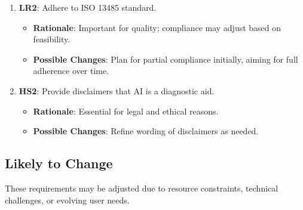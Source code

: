 \documentclass[12pt]{article}
\begin{document}
\begin{enumerate}[resume]
    \item \textbf{LR2}: Adhere to ISO 13485 standard.
    \begin{itemize}[label=-]
        \item \textbf{Rationale}: Important for quality; compliance may adjust based on feasibility.
        \item \textbf{Possible Changes}: Plan for partial compliance initially, aiming for full adherence over time.
    \end{itemize}

    \item \textbf{HS2}: Provide disclaimers that AI is a diagnostic aid.
    \begin{itemize}[label=-]
        \item \textbf{Rationale}: Essential for legal and ethical reasons.
        \item \textbf{Possible Changes}: Refine wording of disclaimers as needed.
    \end{itemize}
\end{enumerate}

\subsection{Likely to Change}

These requirements may be adjusted due to resource constraints, technical challenges, or evolving user needs.
\end{document}
